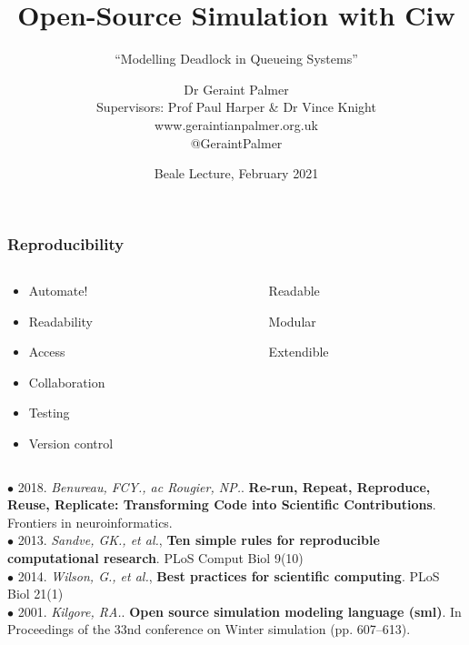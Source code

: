 \documentclass[xcolor={table}]{beamer}
\title{Open-Source Simulation with Ciw}
\subtitle{``Modelling Deadlock in Queueing Systems''}
\author{Dr Geraint Palmer\\Supervisors: Prof Paul Harper \& Dr Vince Knight\\\textcolor{textorange}{www.geraintianpalmer.org.uk}\\\textcolor{textorange}{@GeraintPalmer} \vspace{-5mm}}
\date{Beale Lecture, February 2021}
\begin{document}
\frame{\titlepage}


\begin{frame}
\frametitle{Reproducibility}
\begin{columns}
\begin{column}{0.5\textwidth}
\large{
\begin{itemize}
  \item Automate!
  \item Readability
  \item Access
  \item Collaboration
  \item Testing
  \item Version control
\end{itemize}
}
\end{column}
\begin{column}{0.5\textwidth}
\begin{tcolorbox}[colback=ciwyellow!20, colframe=ciwyellow, height=1.5cm, valign=center]
\centering
\LARGE{Readable}
\end{tcolorbox}
\begin{tcolorbox}[colback=mplblue!20, colframe=mplblue, height=1.5cm, valign=center]
\centering
\LARGE{Modular}
\end{tcolorbox}
\begin{tcolorbox}[colback=textorange!20, colframe=textorange, height=1.5cm, valign=center]
\centering
\LARGE{Extendible}
\end{tcolorbox}
\end{column}
\end{columns}

\vspace{2mm}

\tiny{\textcolor{textorange}{$\bullet$ 2018. \textit{Benureau, FCY., ac Rougier, NP.}. \textbf{Re-run, Repeat, Reproduce, Reuse, Replicate: Transforming Code into Scientific Contributions}. Frontiers in neuroinformatics.}}\\
\tiny{\textcolor{textorange}{$\bullet$ 2013. \textit{Sandve, GK., et al.}, \textbf{Ten simple rules for reproducible computational research}. PLoS Comput Biol 9(10)}}\\
\tiny{\textcolor{textorange}{$\bullet$ 2014. \textit{Wilson, G., et al.}, \textbf{Best practices for scientific computing}. PLoS Biol 21(1)}}\\
\tiny{\textcolor{textorange}{$\bullet$ 2001. \textit{Kilgore, RA.}. \textbf{Open source simulation modeling language (sml)}. In Proceedings of the 33nd conference on Winter simulation (pp. 607–613).}}
\end{frame}
\end{document}
